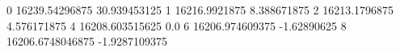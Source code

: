 0 16239.54296875 30.939453125
1 16216.9921875 8.388671875
2 16213.1796875 4.576171875
4 16208.603515625 0.0
6 16206.974609375 -1.62890625
8 16206.6748046875 -1.9287109375
